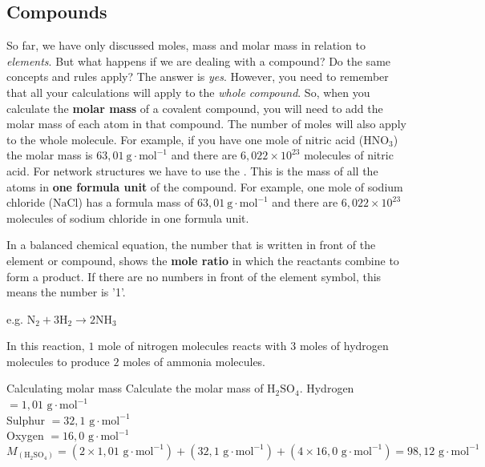             \subsection*{Compounds}
            \nopagebreak
      \label{m38717*id278284}So far, we have only discussed moles, mass and molar mass in relation to \textsl{elements}. But what happens if we are dealing with a compound? Do the same concepts and rules apply? The answer is \textsl{yes}. However, you need to remember that all your calculations will apply to the \textsl{whole compound}. So, when you calculate the \textbf{molar mass} of a covalent compound, you will need to add the molar mass of each atom in that compound. The number of moles will also apply to the whole molecule. For example, if you have one mole of nitric acid ($\text{HNO}_{3}$) the molar mass is $63,01~\text{g}\cdot{\text{mol}}^{-1}$ and there are $6,022 \times 10^{23}$ molecules of nitric acid. For network structures we have to use the . This is the mass of all the atoms in \textbf{one formula unit} of the compound. For example, one mole of sodium chloride ($\text{NaCl}$) has a formula mass of $63,01~\text{g}\cdot{\text{mol}}^{-1}$ and there are $6,022 \times 10^{23}$ molecules of sodium chloride in one formula unit. \par 
      \label{m38717*id278429}In a balanced chemical equation, the number that is written in front of the element or compound, shows the \textbf{mole ratio} in which the reactants combine to form a product. If there are no numbers in front of the element symbol, this means the number is '1'.\par 
{}
      \label{m38717*id278442}e.g. ${\text{N}}_{2}+3{\text{H}}_{2}\to 2\text{N}{\text{H}}_{3}$\par 
      \label{m38717*id278488}In this reaction, $1$ mole of nitrogen molecules reacts with $3$ moles of hydrogen molecules to produce $2$ moles of ammonia molecules.\par 
\label{m38717*secfhsst!!!underscore!!!id566}
      \begin{wex}{Calculating molar mass }{
      \label{m38717*probfhsst!!!underscore!!!id567}
      \label{m38717*id278505}Calculate the molar mass of $\text{H}_{2}\text{SO}_{4}$.
      }
{
Hydrogen $=1,01 \text{ g} \cdot \text{mol}^{-1}$ \\ 
Sulphur $=32,1\text{ g} \cdot \text{mol}^{-1}$ \\
Oxygen $=16,0 \text{ g} \cdot \text{mol}^{-1}$ 
      \label{m38717*id278632}\nopagebreak\noindent{}
    \begin{equation*}
    {M}_{(\text{H}_{2}\text{SO}_{4})}=(2 \times 1,01 \text{ g} \cdot \text{mol}^{-1}) + (32,1 \text{ g} \cdot \text{mol}^{-1}) + (4 \times 16,0 \text{ g} \cdot \text{mol}^{-1} ) = 98,12 \text{ g} \cdot \text{mol}^{-1}
      \end{equation*}
}
    \end{wex}
    \noindent

